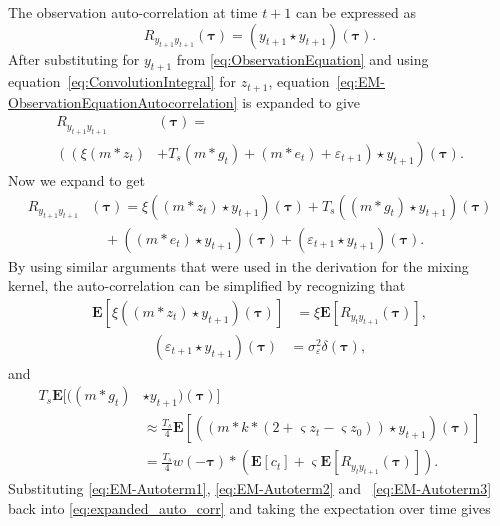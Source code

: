 \documentclass[10pt,twocolumn,twoside]{IEEEtran}
\begin{document}
The observation auto-correlation at time $t+1$ can be expressed as
\begin{equation}\label{eq:EM-ObservationEquationAutocorrelation}
	R_{y_{t+1}y_{t+1}}(\boldsymbol{\tau})=(y_{t+1} \star y_{t+1})(\boldsymbol\tau).
\end{equation}
 After substituting for $y_{t+1}$ from \eqref{eq:ObservationEquation} and using equation~\eqref{eq:ConvolutionIntegral}   for $z_{t+1}$,  equation~\eqref{eq:EM-ObservationEquationAutocorrelation} is expanded to give 
\begin{align}\label{eq:EM-expanded_auto_corr}  
	R_{y_{t+1}y_{t+1}} & (\boldsymbol{\tau}) = \\ \nonumber 
	\left( \left(\xi( m\ast z_{t}) \right.\right.&+\left.\left.
T_s(m\ast g_{t}) + ( m \ast e_{t})+\varepsilon_{t+1} \right) \star y_{t+1} \right) (\boldsymbol{\tau}).
\end{align}
Now we expand to get
\begin{align}\label{eq:expanded_auto_corr}
	R_{y_{t+1}y_{t+1}}&(\boldsymbol{\tau}) = \xi((m \ast z_{t}) \star y_{t+1})(\boldsymbol{\tau})+T_s((m\ast g_{t})\star y_{t+1})(\boldsymbol{\tau}) \nonumber \\
	&\quad+((m\ast e_{t})\star  y_{t+1})(\boldsymbol{\tau})+(\varepsilon_{t+1} \star y_{t+1})(\boldsymbol{\tau}).
\end{align}
By using similar arguments that were used in the derivation for the mixing kernel, the auto-correlation can be simplified by recognizing that
\begin{align}\label{eq:EM-Autoterm1} 
  \mathbf{E}[\xi((m\ast z_{t})\star y_{t+1})(\boldsymbol{\tau})]&=\xi \mathbf{E}[ R_{y_ty_{t+1}}(\boldsymbol{\tau})],
\end{align}
\begin{align}\label{eq:EM-Autoterm2}
 (\varepsilon_{t+1}\star y_{t+1})(\boldsymbol\tau)&=\sigma_{\varepsilon}^2\delta(\boldsymbol{\tau}),
\end{align} 
and
\begin{align}\label{eq:EM-Autoterm3} 
	T_s\mathbf{E}[((m\ast g_t) &\star y_{t+1})(\boldsymbol\tau)] \nonumber \\ 
	&\approx \frac{T_s}{4}\mathbf{E}[((m \ast k \ast (2 + \varsigma z_t - \varsigma z_0))\star y_{t+1})(\boldsymbol\tau)] \nonumber \\
	&= \frac{T_s}{4} w(-\boldsymbol\tau) \ast (\mathbf{E}\left[c_t\right] + \varsigma \mathbf{E}\left[R_{y_ty_{t+1}}(\boldsymbol\tau)\right] ).
\end{align}
Substituting \eqref{eq:EM-Autoterm1}, \eqref{eq:EM-Autoterm2} and ~\eqref{eq:EM-Autoterm3} back into \eqref{eq:expanded_auto_corr} and taking the expectation over time  gives
\end{document}
